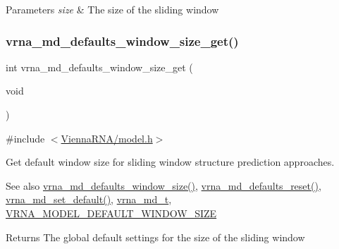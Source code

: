\begin{DoxyParams}{Parameters}
{\em size} & The size of the sliding window \\
\hline
\end{DoxyParams}
\mbox{\label{group__model__details_ga670146a9aa3ba77f4d422d60b7c30ac9}} 
\subsubsection{\texorpdfstring{vrna\+\_\+md\+\_\+defaults\+\_\+window\+\_\+size\+\_\+get()}{vrna\_md\_defaults\_window\_size\_get()}}
{\footnotesize\ttfamily int vrna\+\_\+md\+\_\+defaults\+\_\+window\+\_\+size\+\_\+get (\begin{DoxyParamCaption}\item[{void}]{ }\end{DoxyParamCaption})}



{\ttfamily \#include $<$\hyperlink{model_8h}{Vienna\+R\+N\+A/model.\+h}$>$}



Get default window size for sliding window structure prediction approaches. 

\begin{DoxySeeAlso}{See also}
\hyperlink{group__model__details_ga7b802ce0e8c3181bf5cb580de6d5b26a}{vrna\+\_\+md\+\_\+defaults\+\_\+window\+\_\+size()}, \hyperlink{group__model__details_ga70834424cf804d149937de89f80ceb45}{vrna\+\_\+md\+\_\+defaults\+\_\+reset()}, \hyperlink{group__model__details_ga8ac6ff84936282436f822644bf841f66}{vrna\+\_\+md\+\_\+set\+\_\+default()}, \hyperlink{group__model__details_ga1f8a10e12a0a1915f2a4eff0b28ea17c}{vrna\+\_\+md\+\_\+t}, \hyperlink{group__model__details_ga8de04a9cb57e811e313b0f9f207f6bdb}{V\+R\+N\+A\+\_\+\+M\+O\+D\+E\+L\+\_\+\+D\+E\+F\+A\+U\+L\+T\+\_\+\+W\+I\+N\+D\+O\+W\+\_\+\+S\+I\+ZE} 
\end{DoxySeeAlso}
\begin{DoxyReturn}{Returns}
The global default settings for the size of the sliding window 
\end{DoxyReturn}
\mbox{\label{group__model__details_ga41521d5b9fb7e0f31e7ea73f5792afab}} 
